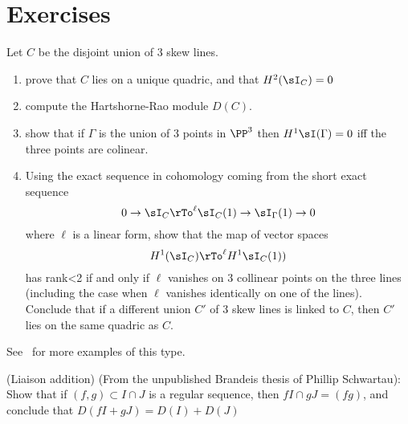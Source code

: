\section{Exercises}
\begin{exercise}
Let $C$ be the disjoint union of 3 skew lines. 
\begin{enumerate}
 \item prove that $C$ lies on a unique quadric, and that $H^2(\sI_C) = 0$
 \item compute the Hartshorne-Rao module $D(C)$.
 \item show that if $\Gamma$ is the union of 3 points in $\PP^3$ then
 $H^1\sI(\Gamma) = 0$ iff the three points are colinear.
 \item Using the exact sequence in cohomology coming from the short exact sequence
$$
0\to \sI_C \rTo^{\ell} \sI_C(1) \to \sI_\Gamma(1) \to 0
$$
where $\ell$ is a linear form, show that the map of vector spaces
$$
H^1(\sI_C) \rTo^{\ell} H^1\sI_C(1))
$$
has rank<2 if and only if $\ell$ vanishes on 3 collinear points on the three lines (including the case when $\ell$ vanishes identically on one of the lines).
Conclude that if a different union $C'$ of 3 skew lines is linked to $C$, then $C'$ lies on the same quadric as $C$.
\end{enumerate}
See~\cite{Migliore} for more examples of this type.
\end{exercise}

\begin{exercise} (Liaison addition)
(From the unpublished Brandeis thesis of Phillip Schwartau): Show that if $(f, g)\subset I\cap J$ is a regular sequence,
 then $f I \cap gJ = (fg)$, and conclude that $D(fI+gJ) = D(I)+D(J)$
\end{exercise}

